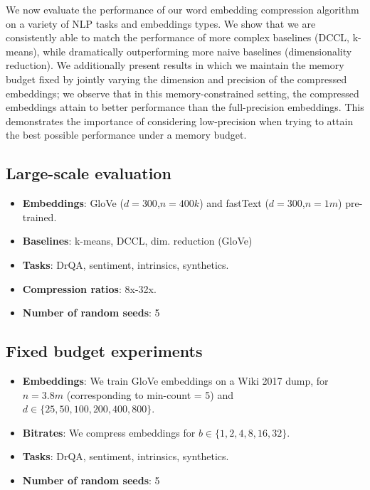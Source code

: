 We now evaluate the performance of our word embedding compression algorithm on a variety of NLP tasks and embeddings types.
We show that we are consistently able to match the performance of more complex baselines (DCCL, k-means), while dramatically outperforming more naive baselines (dimensionality reduction).
We additionally present results in which we maintain the memory budget fixed by  jointly varying the dimension and precision of the compressed embeddings;
we observe that in this memory-constrained setting, the compressed embeddings attain  to  better performance than the full-precision embeddings.
This demonstrates the importance of considering low-precision when trying to attain the best possible performance under a memory budget.

\subsection{Large-scale evaluation}
\begin{itemize}
	\item \textbf{Embeddings}: GloVe ($d=300$,$n=400k$) and fastText ($d=300$,$n=1m$) pre-trained.
	\item \textbf{Baselines}: k-means, DCCL, dim. reduction (GloVe)
	\item \textbf{Tasks}: DrQA, sentiment, intrinsics, synthetics.
	\item \textbf{Compression ratios}: 8x-32x.
	\item \textbf{Number of random seeds}: 5
\end{itemize}
\subsection{Fixed budget experiments}
\begin{itemize}
	\item \textbf{Embeddings}: We train GloVe embeddings on a Wiki 2017 dump, for $n=3.8m$ (corresponding to min-count = 5) and $d \in \{25,50,100,200,400,800\}$.
	\item \textbf{Bitrates}: We compress embeddings for $b \in \{1,2,4,8,16,32\}$.
	\item \textbf{Tasks}: DrQA, sentiment, intrinsics, synthetics.
	\item \textbf{Number of random seeds}: 5
\end{itemize}